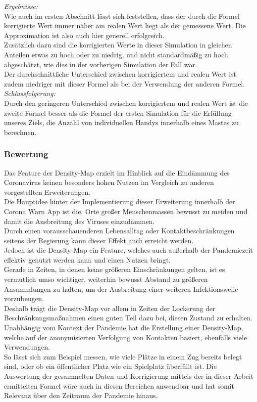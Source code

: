 \documentclass[conference]{IEEEtran}
\begin{document}
\textit{Ergebnisse:}\\
Wie auch im ersten Abschnitt lässt sich feststellen, dass der durch die Formel korrigierte Wert immer näher am realen Wert liegt als der gemessene Wert. Die Approximation ist also auch hier generell erfolgreich.\\
Zusätzlich dazu sind die korrigierten Werte in dieser Simulation in gleichen Anteilen etwas zu hoch oder zu niedrig, und nicht standardmäßig zu hoch abgeschätzt, wie dies in der vorherigen Simulation der Fall war.\\
Der durchschnittliche Unterschied zwischen korrigiertem und realen Wert ist zudem niedriger mit dieser Formel als bei der Verwendung der anderen Formel.\\


\textit{Schlussfolgerung:}\\
Durch den geringeren Unterschied zwischen korrigiertem und realen Wert ist die zweite Formel besser als die Formel der ersten Simulation für die Erfüllung unseres Ziels, die Anzahl von individuellen Handys innerhalb eines Mastes zu berechnen.\\

\subsubsection{Bewertung}
Das Feature der Density-Map erzielt im Hinblick auf die Eindämmung des Coronavirus keinen besonders hohen Nutzen im Vergleich zu anderen vorgestellten Erweiterungen.\\
Die Hauptidee hinter der Implementierung dieser Erweiterung innerhalb der Corona Warn App ist die, Orte großer Menschenmassen bewusst zu meiden und damit die Ausbreitung des Viruses einzudämmen.\\
Durch einen vorausschauenderen Lebensalltag oder Kontaktbeschränkungen seitens der Regierung kann dieser Effekt auch erreicht werden.\\
Jedoch ist die Density-Map ein Feature, welches auch außerhalb der Pandemiezeit effektiv genutzt werden kann und einen Nutzen bringt.\\
Gerade in Zeiten, in denen keine größeren Einschränkungen gelten, ist es vermutlich umso wichtiger, weiterhin bewusst Abstand zu größeren Ansammlungen zu halten, um der Ausbreitung einer weiteren Infektionswelle vorzubeugen.\\
Deshalb trägt die Density-Map vor allem in Zeiten der Lockerung der Beschränkungsmaßnahmen einen guten Teil dazu bei, diesen Zustand zu erhalten.\\
Unabhängig vom Kontext der Pandemie hat die Erstellung einer Density-Map, welche auf der anonymisierten Verfolgung von Kontakten basiert, ebenfalls viele Verwendungen.\\
So lässt sich zum Beispiel messen, wie viele Plätze in einem Zug bereits belegt sind, oder ob ein öffentlicher Platz wie ein Spielplatz überfüllt ist. Die Auswertung der gesammelten Daten und Korrigierung mittels der in dieser Arbeit ermittelten Formel wäre auch in diesen Bereichen anwendbar und hat somit Relevanz über den Zeitraum der Pandemie hinaus.\\
\end{document}
